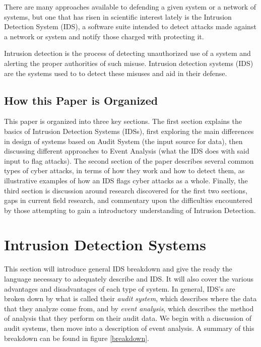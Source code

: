 \documentclass{acm_proc_article-sp}
\begin{document}
	There are many approaches available to defending a given system or a network of systems, but one that has risen in scientific interest lately is the Intrusion Detection System (IDS), a software suite intended to detect attacks made against a network or system and notify those charged with protecting it.
	
	Intrusion detection is the process of detecting unauthorized use of a system and alerting the proper authorities of such misuse. Intrusion detection systems (IDS) are the systems used to to detect these misuses and aid in their defense. 
    \subsection{How this Paper is Organized}
    	This paper is organized into three key sections. The first section explains the basics of Intrusion Detection Systems (IDSs), first exploring the main differences in design of systems based on Audit System (the input source for data), then discussing different approaches to Event Analysis (what the IDS does with said input to flag attacks). The second section of the paper describes several common types of cyber attacks, in terms of how they work and how to detect them, as illustrative examples of how an IDS flags cyber attacks as a whole. Finally, the third section is discussion around research discovered for the first two sections, gaps in current field research, and commentary upon the difficulties encountered by those attempting to gain a introductory understanding of Intrusion Detection.
    	
\section{Intrusion Detection Systems}
    This section will introduce general IDS breakdown and give the ready the language necessary to adequately describe and IDS. It will also cover the various advantages and disadvantages of each type of system. In general, IDS's are broken down by what is called their \emph{audit system}, which describes where the data that they analyze come from, and by \emph{event analysis}, which describes the method of analysis that they perform on their audit data. We begin with a discussion of audit systems, then move into a description of event analysis. A summary of this breakdown can be found in figure \ref{breakdown}.
\end{document}

